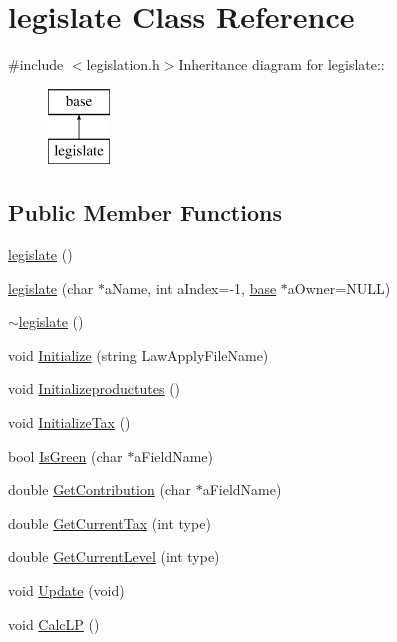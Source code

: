 \hypertarget{classlegislate}{
\section{legislate Class Reference}
\label{classlegislate}
}


{\ttfamily \#include $<$legislation.h$>$}Inheritance diagram for legislate::\begin{figure}[H]
\begin{center}
\leavevmode
\includegraphics[height=2cm]{classlegislate}
\end{center}
\end{figure}
\subsection*{Public Member Functions}
\begin{DoxyCompactItemize}
\item 
\hyperlink{classlegislate_a64eb8d7a8bd6b552187b279476135bda}{legislate} ()
\item 
\hyperlink{classlegislate_adbe3b26cc6e03c3ab2fa9618c7c4916e}{legislate} (char $\ast$aName, int aIndex=-\/1, \hyperlink{classbase}{base} $\ast$aOwner=NULL)
\item 
\hyperlink{classlegislate_a7119b4f1b6d127bd8de4a2cb137325e2}{$\sim$legislate} ()
\item 
void \hyperlink{classlegislate_ad843a70145258602b6498888fcc6071b}{Initialize} (string LawApplyFileName)
\item 
void \hyperlink{classlegislate_a90c8e0899b14eb5b00029f8d70d409aa}{Initializeproductutes} ()
\item 
void \hyperlink{classlegislate_a20f65128d1ed14fc55f297179d9fc2f1}{InitializeTax} ()
\item 
bool \hyperlink{classlegislate_a21ea475cf056d4912ce704f5468650df}{IsGreen} (char $\ast$aFieldName)
\item 
double \hyperlink{classlegislate_a492a5696879bad9d24c6f4f882f0f4fd}{GetContribution} (char $\ast$aFieldName)
\item 
double \hyperlink{classlegislate_a5b9e7dced822a702531be6014a5d8384}{GetCurrentTax} (int type)
\item 
double \hyperlink{classlegislate_afaa572033956815914b8d918c75c2688}{GetCurrentLevel} (int type)
\item 
void \hyperlink{classlegislate_adec72b5fc80eb682053afdd9f8793fa2}{Update} (void)
\item 
void \hyperlink{classlegislate_a0e5d387c97dfb83092af5011888639b5}{CalcLP} ()
\end{DoxyCompactItemize}

